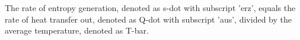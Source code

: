 The rate of entropy generation, denoted as s-dot with subscript 'erz', equals the rate of heat transfer out, denoted as Q-dot with subscript 'aus', divided by the average temperature, denoted as T-bar.